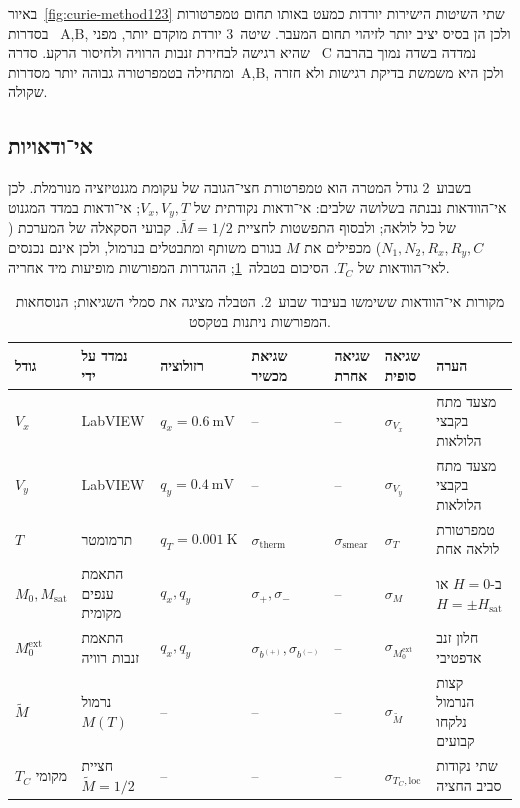 \documentclass{extarticle}
\begin{document}
באיור~\ref{fig:curie-method123} שתי השיטות הישירות יורדות כמעט באותו תחום טמפרטורות בסדרות~
\textenglish{A,B},
ולכן הן בסיס יציב יותר לזיהוי תחום המעבר. שיטה~3 יורדת מוקדם יותר, מפני שהיא רגישה לבחירת זנבות הרוויה ולחיסור הרקע. סדרה~
\textenglish{C}
נמדדה בשדה נמוך בהרבה ומתחילה בטמפרטורה גבוהה יותר מסדרות~\textenglish{A,B}, ולכן היא משמשת בדיקת רגישות ולא חזרה שקולה.

\subsection{אי־ודאויות}
בשבוע~2 גודל המטרה הוא טמפרטורת חצי־הגובה של עקומת מגנטיזציה מנורמלת. לכן אי־הוודאות נבנתה בשלושה שלבים: אי־ודאות נקודתית של
$V_x,V_y,T$;
אי־ודאות במדד המגנוט של כל לולאה; ולבסוף התפשטות לחציית
$\tilde M=1/2$.
קבועי הסקאלה של המערכת
($N_1,N_2,R_x,R_y,C$)
מכפילים את
$M$
בגורם משותף ומתבטלים בנרמול, ולכן אינם נכנסים לאי־הוודאות של
$T_C$.
הסיכום בטבלה~\ref{tab:uncertainties-week2}; ההגדרות המפורשות מופיעות מיד אחריה.

\begin{table}[H]
\centering
\scriptsize
\setlength{\tabcolsep}{2pt}
\begin{tabularx}{\textwidth}{@{}>{\raggedleft\arraybackslash}p{}>{\raggedleft\arraybackslash}p{}>{\raggedleft\arraybackslash}p{}>{\raggedleft\arraybackslash}p{}>{\raggedleft\arraybackslash}p{}>{\raggedleft\arraybackslash}X>{\raggedleft\arraybackslash}p{}@{}}
\toprule
גודל & נמדד על ידי & רזולוציה & שגיאת מכשיר & שגיאה אחרת & שגיאה סופית & הערה \\
\midrule
$V_x$ & \textenglish{LabVIEW} & $q_x=\SI{0.6}{\milli\volt}$ & -- & -- & $\sigma_{V_x}$ & מצעד מתח בקבצי הלולאות \\
$V_y$ & \textenglish{LabVIEW} & $q_y=\SI{0.4}{\milli\volt}$ & -- & -- & $\sigma_{V_y}$ & מצעד מתח בקבצי הלולאות \\
$T$ & תרמומטר & $q_T=\SI{0.001}{\kelvin}$ & $\sigma_{\mathrm{therm}}$ & $\sigma_{\mathrm{smear}}$ & $\sigma_T$ & טמפרטורת לולאה אחת \\
$M_0,M_{\mathrm{sat}}$ & התאמת ענפים מקומית & $q_x,q_y$ & $\sigma_{+},\sigma_{-}$ & -- & $\sigma_M$ & ב-$H=0$ או $H=\pm H_{\mathrm{sat}}$ \\
$M_0^{\mathrm{ext}}$ & התאמת זנבות רוויה & $q_x,q_y$ & $\sigma_{b^{(+)}},\sigma_{b^{(-)}}$ & -- & $\sigma_{M_0^{\mathrm{ext}}}$ & חלון זנב אדפטיבי \\
$\tilde M$ & נרמול $M(T)$ & -- & -- & -- & $\sigma_{\tilde M}$ & קצות הנרמול נלקחו קבועים \\
$T_C$ מקומי & חציית $\tilde M=1/2$ & -- & -- & -- & $\sigma_{T_C,\mathrm{loc}}$ & שתי נקודות סביב החציה \\
\bottomrule
\end{tabularx}
\caption{מקורות אי־הוודאות ששימשו בעיבוד שבוע~2. הטבלה מציגה את סמלי השגיאות; הנוסחאות המפורשות ניתנות בטקסט.}
\label{tab:uncertainties-week2}
\end{table}
\end{document}
